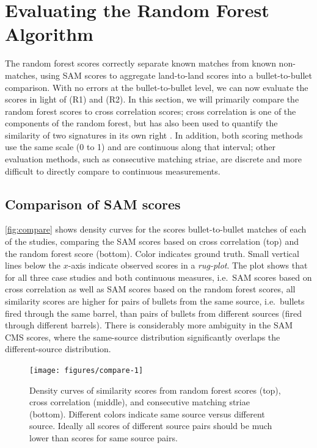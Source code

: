 \documentclass[doubleblind]{elsarticle}\usepackage[]{graphicx}\usepackage[]{color}
\newenvironment{knitrout}{}{} %
\begin{document}
\section{Evaluating the Random Forest Algorithm}
The random forest scores correctly separate known matches from known non-matches, using SAM scores to aggregate land-to-land scores into a bullet-to-bullet comparison. With no errors at the bullet-to-bullet level, we can now evaluate the scores in light of (R1) and (R2). In this section, we will primarily compare the random forest scores to cross correlation scores; cross correlation is one of the components of the random forest, but has also been used to quantify the similarity of two signatures in its own right \citep{chuPilotStudyAutomated2010}. In addition, both scoring methods use the same scale (0 to 1) and are continuous along that interval; other evaluation methods, such as consecutive matching striae, are discrete and more difficult to directly compare to continuous measurements.

\subsection{Comparison of SAM scores}
\autoref{fig:compare} shows density curves for the scores bullet-to-bullet matches of each of the studies, comparing the SAM scores based on cross correlation (top) and the random forest score (bottom). Color indicates ground truth. Small vertical lines below the $x$-axis indicate observed scores in a \emph{rug-plot}. The plot shows that for all three case studies and both continuous measures, i.e.\ SAM scores based on cross correlation as well as SAM scores based on the random forest scores, all similarity scores are higher for pairs of bullets from the same source, i.e.\ bullets fired through the same barrel, than pairs of bullets from different sources (fired through different barrels). There is considerably more ambiguity in the SAM CMS scores, where the same-source distribution significantly overlaps the different-source distribution.
 
\begin{knitrout}
\color{fgcolor}\begin{figure}

{\centering \texttt{[image: figures/compare-1]} 

}

\caption[Density curves of similarity scores from random forest scores (top), cross correlation (middle), and consecutive matching striae (bottom)]{Density curves of similarity scores from random forest scores (top), cross correlation (middle), and consecutive matching striae (bottom). Different colors indicate same source versus different source. Ideally all scores of different source pairs should be much lower than scores for same source pairs.}\label{fig:compare}
\end{figure}


\end{knitrout}
\end{document}
